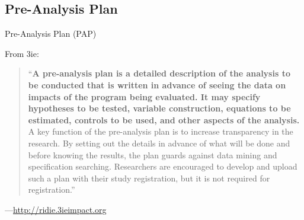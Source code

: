 \documentclass[aspectratio=169]{beamer}
\begin{document}

\subsection*{Pre-Analysis Plan}
\begin{frame}{Pre-Analysis Plan (PAP)}

From 3ie:
\begin{quote}
 ``\textbf{A pre-analysis plan is a detailed description of the analysis to be conducted that is written in advance of seeing the data on impacts of the program being evaluated. It may specify hypotheses to be tested, variable construction, equations to be estimated, controls to be used, and other aspects of the analysis.} A key function of the pre-analysis plan is to increase transparency in the research. By setting out the details in advance of what will be done and before knowing the results, the plan guards against data mining and specification searching. Researchers are encouraged to develop and upload such a plan with their study registration, but it is not required for registration.''  \begin{tiny}\end{tiny}
\end{quote}

---\url{http://ridie.3ieimpact.org}


\end{frame}

%
\end{document}
